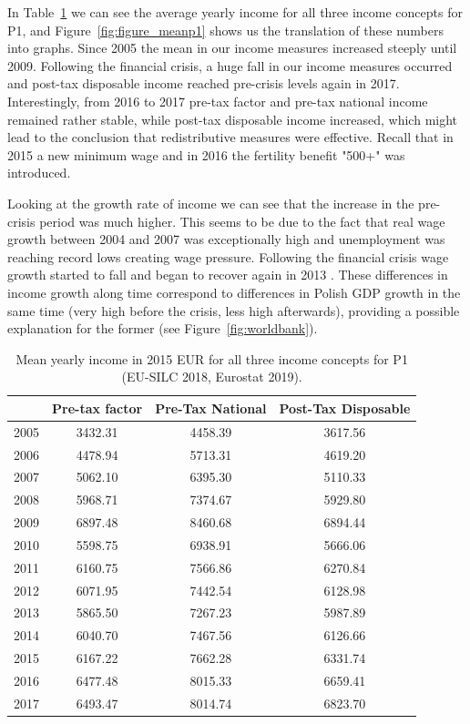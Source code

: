\documentclass[a4paper]{article}\usepackage[]{graphicx}\usepackage[]{color}
\begin{document}
In Table~\ref{mean_p1} we can see the average yearly income for all three income concepts for P1, and Figure~\ref{fig:figure_meanp1} shows us the translation of these numbers into graphs. Since 2005 the mean in our income measures increased steeply until 2009. 
Following the financial crisis, a huge fall in our income measures occurred and post-tax disposable income reached pre-crisis levels again in 2017.
Interestingly, from 2016 to 2017 pre-tax factor and pre-tax national income remained rather stable, while post-tax disposable income increased, which might lead to the conclusion that redistributive measures were effective. Recall that in 2015 a new minimum wage and in 2016 the fertility benefit "500+" was introduced.

Looking at the growth rate of income we can see that the increase in the pre-crisis period was much higher. This seems to be due to the fact that real wage growth between 2004 and 2007 was exceptionally high and unemployment was reaching record lows creating wage pressure. Following the financial crisis wage growth started to fall and began to recover again in 2013 \parencite{lewandowski2018labor, gajewski2015labour}. These differences in income growth along time correspond to differences in Polish GDP growth in the same time (very high before the crisis, less high afterwards), providing a possible explanation for the former (see Figure~\ref{fig:worldbank}).
\begin{table}[ht]
\centering
\begin{tabular}{lccc}
  \toprule
 & Pre-tax factor & Pre-Tax National & Post-Tax Disposable \\ 
  \midrule
2005 & 3432.31 & 4458.39 & 3617.56 \\ 
  2006 & 4478.94 & 5713.31 & 4619.20 \\ 
  2007 & 5062.10 & 6395.30 & 5110.33 \\ 
  2008 & 5968.71 & 7374.67 & 5929.80 \\ 
  2009 & 6897.48 & 8460.68 & 6894.44 \\ 
  2010 & 5598.75 & 6938.91 & 5666.06 \\ 
  2011 & 6160.75 & 7566.86 & 6270.84 \\ 
  2012 & 6071.95 & 7442.54 & 6128.98 \\ 
  2013 & 5865.50 & 7267.23 & 5987.89 \\ 
  2014 & 6040.70 & 7467.56 & 6126.66 \\ 
  2015 & 6167.22 & 7662.28 & 6331.74 \\ 
  2016 & 6477.48 & 8015.33 & 6659.41 \\ 
  2017 & 6493.47 & 8014.74 & 6823.70 \\ 
   \bottomrule
\end{tabular}
\caption{Mean yearly income in 2015 EUR for all three income concepts for P1 (EU-SILC 2018, Eurostat 2019).} 
\label{mean_p1}
\end{table}
\end{document}
